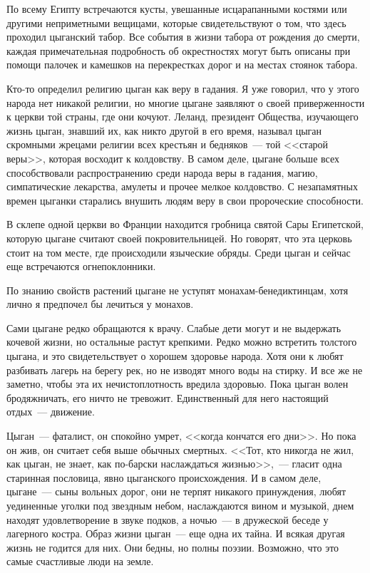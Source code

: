 \documentclass[12pt,a4paper,twoside,openany,svgnames]{memoir}
\begin{document}
По всему Египту встречаются кусты, увешанные исцарапанными костями или другими неприметными вещицами, которые свидетельствуют о том, что здесь проходил цыганский табор. Все события в жизни табора от рождения до смерти, каждая примечательная подробность об окрестностях могут быть описаны при помощи палочек и камешков на перекрестках дорог и на местах стоянок табора.

Кто-то определил религию цыган как веру в гадания. Я уже говорил, что у этого народа нет никакой религии, но многие цыгане заявляют о своей приверженности к церкви той страны, где они кочуют. Леланд, президент Общества, изучающего жизнь цыган, знавший их, как никто другой в его время, называл цыган скромными жрецами религии всех крестьян и бедняков~--- той <<старой веры>>, которая восходит к колдовству. В самом деле, цыгане больше всех способствовали распространению среди народа веры в гадания, магию, симпатические лекарства, амулеты и прочее мелкое колдовство. С незапамятных времен цыганки старались внушить людям веру в свои пророческие способности.

В склепе одной церкви во Франции находится гробница святой Сары Египетской, которую цыгане считают своей покровительницей. Но говорят, что эта церковь стоит на том месте, где происходили языческие обряды. Среди цыган и сейчас еще встречаются огнепоклонники.

По знанию свойств растений цыгане не уступят монахам-бенедиктинцам, хотя лично я предпочел бы лечиться у монахов.

Сами цыгане редко обращаются к врачу. Слабые дети могут и не выдержать кочевой жизни, но остальные растут крепкими. Редко можно встретить толстого цыгана, и это свидетельствует о хорошем здоровье народа. Хотя они к любят разбивать лагерь на берегу рек, но не изводят много воды на стирку. И все же не заметно, чтобы эта их нечистоплотность вредила здоровью. Пока цыган волен бродяжничать, его ничто не тревожит. Единственный для него настоящий отдых~--- движение.

Цыган~--- фаталист, он спокойно умрет, <<когда кончатся его дни>>. Но пока он жив, он считает себя выше обычных смертных. <<Тот, кто никогда не жил, как цыган, не знает, как по-барски наслаждаться жизнью>>,~--- гласит одна старинная пословица, явно цыганского происхождения. И в самом деле, цыгане~--- сыны вольных дорог, они не терпят никакого принуждения, любят уединенные уголки под звездным небом, наслаждаются вином и музыкой, днем находят удовлетворение в звуке подков, а ночью~--- в дружеской беседе у лагерного костра. Образ жизни цыган~--- еще одна их тайна. И всякая другая жизнь не годится для них. Они бедны, но полны поэзии. Возможно, что это самые счастливые люди на земле.
\end{document}
